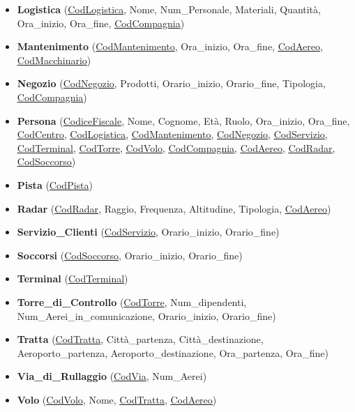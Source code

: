 \begin{itemize}
	\item \textbf{\small Logistica} \textsf{\small (\underline{CodLogistica}, Nome, Num\_Personale, Materiali, Quantità, Ora\_inizio, Ora\_fine, \underline{\underline{CodCompagnia}})}
	\item \textbf{\small Mantenimento} \textsf{\small (\underline{CodMantenimento}, Ora\_inizio, Ora\_fine, \underline{\underline{CodAereo}}, \underline{\underline{CodMacchinario}})}
	\item \textbf{\small Negozio} \textsf{\small (\underline{CodNegozio}, Prodotti, Orario\_inizio, Orario\_fine, Tipologia, \underline{\underline{CodCompagnia}})}
	\item \textbf{\small Persona} \textsf{\small (\underline{CodiceFiscale}, Nome, Cognome, Età, Ruolo, Ora\_inizio, Ora\_fine, \underline{\underline{CodCentro}}, \underline{\underline{CodLogistica}}, \underline{\underline{CodMantenimento}}, \underline{\underline{CodNegozio}}, \underline{\underline{CodServizio}}, \underline{\underline{CodTerminal}}, \underline{\underline{CodTorre}}, \underline{\underline{CodVolo}}, \underline{\underline{CodCompagnia}}, \underline{\underline{CodAereo}}, \underline{\underline{CodRadar}}, \underline{\underline{CodSoccorso}})}
	\item \textbf{\small Pista} \textsf{\small (\underline{CodPista})}
	\item \textbf{\small Radar} \textsf{\small (\underline{CodRadar}, Raggio, Frequenza, Altitudine, Tipologia, \underline{\underline{CodAereo}})}
	\item \textbf{\small Servizio\_Clienti} \textsf{\small (\underline{CodServizio}, Orario\_inizio, Orario\_fine)}
	\item \textbf{\small Soccorsi} \textsf{\small (\underline{CodSoccorso}, Orario\_inizio, Orario\_fine)}
	\item \textbf{\small Terminal} \textsf{\small (\underline{CodTerminal})}
	\item \textbf{\small Torre\_di\_Controllo} \textsf{\small (\underline{CodTorre}, Num\_dipendenti, Num\_Aerei\_in\_comunicazione, Orario\_inizio, Orario\_fine)}
	\item \textbf{\small Tratta} \textsf{\small (\underline{CodTratta}, Città\_partenza, Città\_destinazione, Aeroporto\_partenza, Aeroporto\_destinazione, Ora\_partenza, Ora\_fine)}
	\item \textbf{\small Via\_di\_Rullaggio} \textsf{\small (\underline{CodVia}, Num\_Aerei)}
	\item \textbf{\small Volo} \textsf{\small (\underline{CodVolo}, Nome, \underline{\underline{CodTratta}}, \underline{\underline{CodAereo}})}
\end{itemize}

